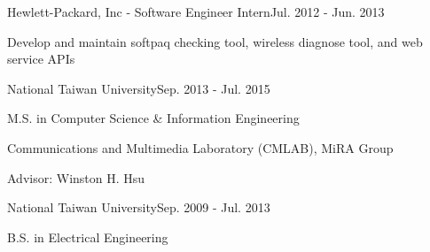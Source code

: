 \documentclass{joel_cv}
\begin{document}

\begin{profExp}{Hewlett-Packard, Inc - Software Engineer Intern}{Jul. 2012 - Jun. 2013}
	\item Develop and maintain softpaq checking tool, wireless diagnose tool, and web service APIs
\end{profExp}

%
%


%
%

\begin{sectionContentSimple}{National Taiwan University}{Sep. 2013 - Jul. 2015}
	\item M.S. in Computer Science \& Information Engineering
	\item Communications and Multimedia Laboratory (CMLAB), MiRA Group
	\item Advisor: Winston H. Hsu
\end{sectionContentSimple}

\begin{sectionContentSimple}{National Taiwan University}{Sep. 2009 - Jul. 2013}
	\item B.S. in Electrical Engineering
\end{sectionContentSimple}

%
%
\end{document}
